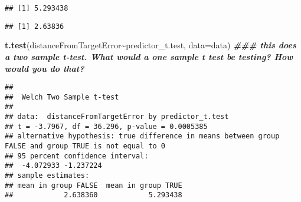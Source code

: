 \documentclass[
]{article}
\newenvironment{Shaded}{\begin{snugshade}}{\end{snugshade}}
\newcommand{\AttributeTok}[1]{\textcolor[rgb]{0.13,0.29,0.53}{#1}}
\newcommand{\ConstantTok}[1]{\textcolor[rgb]{0.56,0.35,0.01}{#1}}
\newcommand{\DecValTok}[1]{\textcolor[rgb]{0.00,0.00,0.81}{#1}}
\newcommand{\DocumentationTok}[1]{\textcolor[rgb]{0.56,0.35,0.01}{\textbf{\textit{#1}}}}
\newcommand{\FloatTok}[1]{\textcolor[rgb]{0.00,0.00,0.81}{#1}}
\newcommand{\FunctionTok}[1]{\textcolor[rgb]{0.13,0.29,0.53}{\textbf{#1}}}
\newcommand{\NormalTok}[1]{#1}
\newcommand{\SpecialCharTok}[1]{\textcolor[rgb]{0.81,0.36,0.00}{\textbf{#1}}}
\newcommand{\StringTok}[1]{\textcolor[rgb]{0.31,0.60,0.02}{#1}}
\begin{document}
\begin{verbatim}
## [1] 5.293438
\end{verbatim}

\begin{Shaded}
\end{Shaded}

\begin{verbatim}
## [1] 2.63836
\end{verbatim}

\begin{Shaded}
\begin{Highlighting}[]
\FunctionTok{t.test}\NormalTok{(distanceFromTargetError}\SpecialCharTok{\textasciitilde{}}\NormalTok{predictor\_t.test, }\AttributeTok{data=}\NormalTok{data) }\DocumentationTok{\#\#\# this does a two sample t{-}test. What would a one sample t test be testing? How would you do that?}
\end{Highlighting}
\end{Shaded}

\begin{verbatim}
## 
##  Welch Two Sample t-test
## 
## data:  distanceFromTargetError by predictor_t.test
## t = -3.7967, df = 36.296, p-value = 0.0005385
## alternative hypothesis: true difference in means between group FALSE and group TRUE is not equal to 0
## 95 percent confidence interval:
##  -4.072933 -1.237224
## sample estimates:
## mean in group FALSE  mean in group TRUE 
##            2.638360            5.293438
\end{verbatim}

\begin{Shaded}
\end{Shaded}
\end{document}
